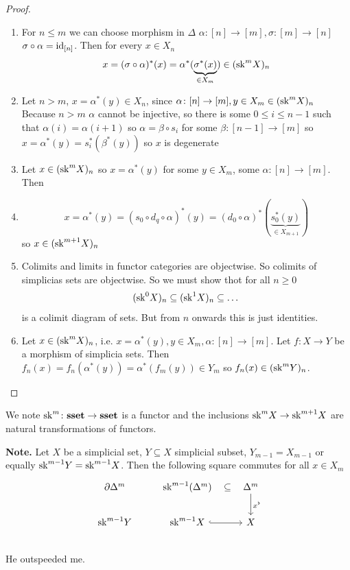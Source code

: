 \documentclass[language=english]{TemplateLecture}
\begin{document}
\begin{proof}
    \begin{enumerate}
        \item For \(n \leq m\) we can choose morphism in \(\Delta\) \(\alpha\colon [n] \to [m], \sigma\colon [m] \to [n]\) \(\sigma\circ \alpha = \operatorname{id}_{[n]}\). Then for every \(x \in X_n\)
        \[x = (\sigma\circ \alpha)^*(x) = \alpha^*(\underbrace{\sigma^*(x)}_{\in X_m})\in (\mathrm{sk}^m X)_n\]
        \item Let \(n > m\), \(x = \alpha^*(y)\in X_n\), since \(\alpha\colon [n]\to [m], y \in X_m \in (\mathrm{sk}^m X)_n\) Because \(n > m\) \(\alpha\) cannot be injective, so there is some \(0 \leq i \leq n-1\) such that \(\alpha(i) = \alpha(i+1)\) so \(\alpha = \beta\circ s_i\) for some \(\beta\colon [n-1]\to [m]\) so \(x = \alpha^*(y) = s_i^*(\beta^*(y))\) so \(x\) is degenerate
        \item Let \(x \in (\mathrm{sk}^m X)_n\) so \(x = \alpha^*(y)\) for some \(y\in X_m\), some \(\alpha\colon [n]\to [m]\). Then
        \item \[x = \alpha^*(y) = (s_0 \circ d_q \circ \alpha)^*(y) = (d_0 \circ \alpha)^*(\underbrace{s_0^*(y)}_{\in X_{m+1}})\]
        so \(x \in (\mathrm{sk}^{m+1}X)_n\)
        \item Colimits and limits in functor categories are objectwise. So colimits of simplicias sets are objectwise. So we must show thot for all \(n \geq 0\)
        \[(\mathrm{sk}^0 X)_n \subseteq (\mathrm{sk}^1 X)_n \subseteq\dots\]
        is a colimit diagram of sets. But from \(n\) onwards this is just identities.
        \item Let \(x \in (\mathrm{sk}^m X)_n\), i.e. \(x = \alpha^*(y), y \in X_m, \alpha\colon [n] \to [m]\). Let \(f \colon X \to Y\) be a morphism of simplicia sets. Then \(f_n(x) = f_n(\alpha^*(y)) = \alpha^*(f_m(y))\in Y_m\) so \(f_n(x)\in (\mathrm{sk}^m Y)_n\).
    \end{enumerate}
\end{proof}

We note \(\mathrm{sk}^m\colon \mathbf{sset}\to \mathbf{sset}\) is a functor and the inclusions \(\mathrm{sk}^m X \to \mathrm{sk}^{m+1} X\) are natural transformations of functors.

\textbf{Note.} Let \(X\) be a simplicial set, \(Y\subseteq X\) simplicial subset, \(Y_{m-1} = X_{m-1}\) or equally \(\mathrm{sk}^{m-1} Y = \mathrm{sk}^{m-1}X\). Then the following square commutes for all \(x \in X_m\)
\[\begin{tikzcd}
    \partial\Delta^m & \sk^{m-1}(\Delta^m)\ar[r, phantom, "\subseteq"] & \Delta^m \ar[d, "x^\flat"] \\
    \sk^{m-1} Y & \sk^{m-1} X \ar[r, hook] & X \\
\end{tikzcd}\]
He outspeeded me.
\end{document}
